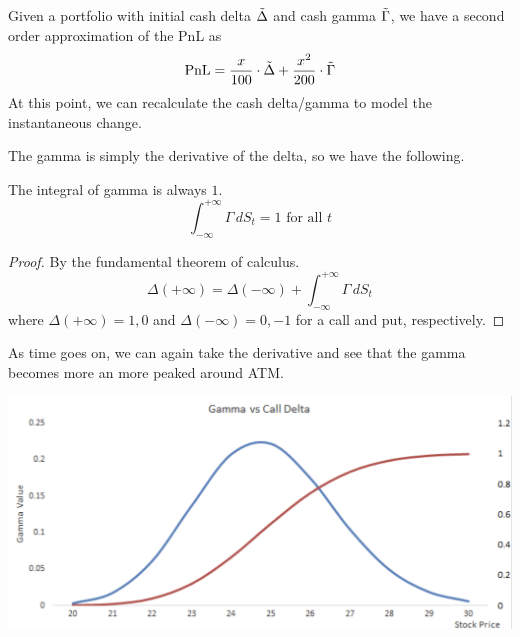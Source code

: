 \documentclass{article}
\begin{document}
    \begin{theorem}
      Given a portfolio with initial cash delta $\Tilde{\Delta}$ and cash gamma $\Tilde{\Gamma}$, we have a second order approximation of the PnL as
      \begin{equation}
        \mathrm{PnL} = \frac{x}{100} \cdot \Tilde{\Delta} + \frac{x^2}{200} \cdot \Tilde{\Gamma}
      \end{equation}
      At this point, we can recalculate the cash delta/gamma to model the instantaneous change.
    \end{theorem}

    \begin{lemma}
      The gamma is simply the derivative of the delta, so we have the following.
    \end{lemma}

    \begin{theorem}
      The integral of gamma is always $1$.
      \begin{equation}
        \int_{-\infty}^{+\infty} \Gamma \,dS_t = 1 \text{ for all } t
      \end{equation}
    \end{theorem}
    \begin{proof}
      By the fundamental theorem of calculus.
      \begin{equation}
        \Delta (+\infty) = \Delta(-\infty) + \int_{-\infty}^{+\infty} \Gamma \,dS_t
      \end{equation}
      where $\Delta(+\infty) = 1, 0$ and $\Delta(-\infty) = 0, -1$ for a call and put, respectively.
    \end{proof}

    \begin{theorem}
      As time goes on, we can again take the derivative and see that the gamma becomes more an more peaked around ATM.
      \begin{center}
        \includegraphics[scale=0.45]{img/gamma_across_time.png}
      \end{center}
    \end{theorem}
\end{document}
